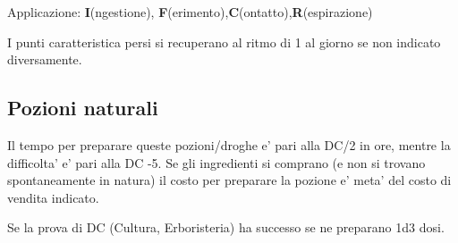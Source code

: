 \documentclass[a4paper,11pt,twoside,openany]{dndbook}
\begin{document}
{Applicazione: \textbf{I}(ngestione), \textbf{F}(erimento),\textbf{C}(ontatto),\textbf{R}(espirazione)
\bigskip

I punti caratteristica persi si recuperano al ritmo di 1 al giorno se non indicato diversamente.

\pagebreak

\subsection{Pozioni naturali}

Il tempo per preparare queste pozioni/droghe e' pari alla DC/2 in ore, mentre la difficolta' e' pari alla DC -5. Se gli ingredienti si comprano (e non si trovano spontaneamente in natura) il costo per preparare la pozione e' meta' del costo di vendita indicato.

Se la prova di DC (Cultura, Erboristeria) ha successo se ne preparano 1d3 dosi.

\bigskip

}
\end{document}
